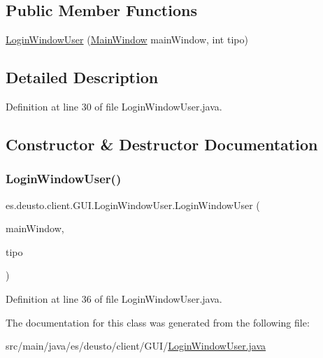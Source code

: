\subsection*{Public Member Functions}
\begin{DoxyCompactItemize}
\item 
\hyperlink{classes_1_1deusto_1_1client_1_1_g_u_i_1_1_login_window_user_a616579d965d1677e6956a864a944ee87}{Login\+Window\+User} (\hyperlink{classes_1_1deusto_1_1client_1_1_g_u_i_1_1_main_window}{Main\+Window} main\+Window, int tipo)
\end{DoxyCompactItemize}


\subsection{Detailed Description}


Definition at line 30 of file Login\+Window\+User.\+java.



\subsection{Constructor \& Destructor Documentation}
\mbox{\label{classes_1_1deusto_1_1client_1_1_g_u_i_1_1_login_window_user_a616579d965d1677e6956a864a944ee87}} 
\subsubsection{\texorpdfstring{Login\+Window\+User()}{LoginWindowUser()}}
{\footnotesize\ttfamily es.\+deusto.\+client.\+G\+U\+I.\+Login\+Window\+User.\+Login\+Window\+User (\begin{DoxyParamCaption}\item[{\hyperlink{classes_1_1deusto_1_1client_1_1_g_u_i_1_1_main_window}{Main\+Window}}]{main\+Window,  }\item[{int}]{tipo }\end{DoxyParamCaption})}



Definition at line 36 of file Login\+Window\+User.\+java.



The documentation for this class was generated from the following file\+:\begin{DoxyCompactItemize}
\item 
src/main/java/es/deusto/client/\+G\+U\+I/\hyperlink{_login_window_user_8java}{Login\+Window\+User.\+java}\end{DoxyCompactItemize}
